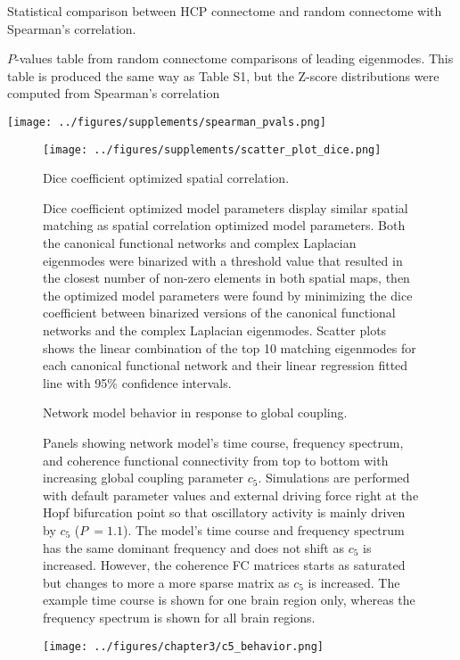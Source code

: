 \begin{table}[ht!]
\centering
\caption{Statistical comparison between HCP connectome and random connectome with Spearman's correlation.}
\caption*{$P$-values table from random connectome comparisons of leading eigenmodes. This table is produced the same way as Table S1, but the Z-score distributions were computed from Spearman's correlation}
\texttt{[image: ../figures/supplements/spearman\_pvals.png]}
\label{tab:S2}
\end{table}

\begin{figure}[ht!]
\centering
\texttt{[image: ../figures/supplements/scatter\_plot\_dice.png]}
\caption{Dice coefficient optimized spatial correlation.}
\caption*{Dice coefficient optimized model parameters display similar spatial matching as spatial correlation optimized model parameters. Both the canonical functional networks and complex Laplacian eigenmodes were binarized with a threshold value that resulted in the closest number of non-zero elements in both spatial maps, then the optimized model parameters were found by minimizing the dice coefficient between binarized versions of the canonical functional networks and the complex Laplacian eigenmodes. Scatter plots shows the linear combination of the top 10 matching eigenmodes for each canonical functional network and their linear regression fitted line with 95\% confidence intervals.}
\label{fig:S3}
\end{figure}

\begin{figure}[htbp]
    \centering
    \caption{Network model behavior in response to global coupling.}
    \caption*{Panels showing network model's time course, frequency spectrum, and coherence functional connectivity from top to bottom with increasing global coupling parameter $c_5$. Simulations are performed with default parameter values and external driving force right at the Hopf bifurcation point so that oscillatory activity is mainly driven by $c_5$ ($P ~= 1.1$). The model's time course and frequency spectrum has the same dominant frequency and does not shift as $c_5$ is increased. However, the coherence FC matrices starts as saturated but changes to more a more sparse matrix as $c_5$ is increased. The example time course is shown for one brain region only, whereas the frequency spectrum is shown for all brain regions.}
    \label{fig:c5_behavior}
\end{figure}
\clearpage
\begin{figure}
	\centering
	\captionsetup{labelformat=adja-page}
	\ContinuedFloat
	\texttt{[image: ../figures/chapter3/c5\_behavior.png]}
	\caption[]{}
\end{figure}


